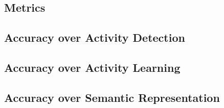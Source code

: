 \subsection{Metrics}
\subsection{Accuracy over Activity Detection}
\subsection{Accuracy over Activity Learning}
\subsection{Accuracy over Semantic Representation}
